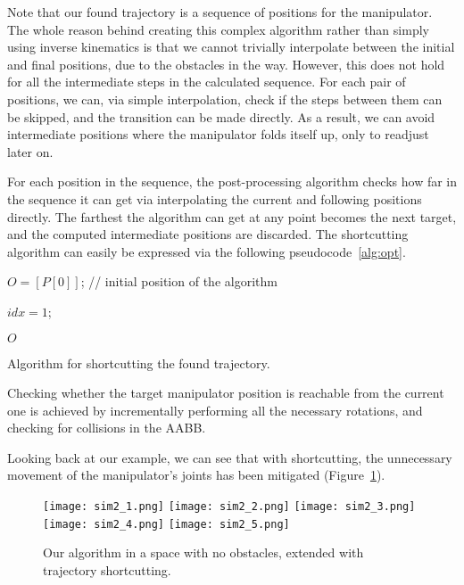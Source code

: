 Note that our found trajectory is a sequence of positions for the manipulator. The whole reason behind creating this complex algorithm rather than simply using inverse kinematics is that we cannot trivially interpolate between the initial and final positions, due to the obstacles in the way. However, this does not hold for all the intermediate steps in the calculated sequence. For each pair of positions, we can, via simple interpolation, check if the steps between them can be skipped, and the transition can be made directly. As a result, we can avoid intermediate positions where the manipulator folds itself up, only to readjust later on.

For each position in the sequence, the post-processing algorithm checks how far in the sequence it can get via interpolating the current and following positions directly. The farthest the algorithm can get at any point becomes the next target, and the computed intermediate positions are discarded. The shortcutting algorithm can easily be expressed via the following pseudocode~\ref{alg:opt}.

\begin{algorithm}

 $O = [P[0]]$; // initial position of the algorithm

 $idx = 1$;


\Return $O$\;

\caption{Algorithm for shortcutting the found trajectory.}\label{alg:opt}
\end{algorithm}

Checking whether the target manipulator position is reachable from the current one is achieved by incrementally performing all the necessary rotations, and checking for collisions in the AABB.

Looking back at our example, we can see that with shortcutting, the unnecessary movement of the manipulator's joints has been mitigated (Figure~\ref{fig:sim2}).

\begin{figure}[ht]
  \centering
  \begin{minipage}{\textwidth}
    \texttt{[image: sim2\_1.png]}
    \texttt{[image: sim2\_2.png]}
    \texttt{[image: sim2\_3.png]}
    \texttt{[image: sim2\_4.png]}
    \texttt{[image: sim2\_5.png]}
  \end{minipage}
  \caption{Our algorithm in a space with no obstacles, extended with trajectory shortcutting.}\label{fig:sim2}
\end{figure}

